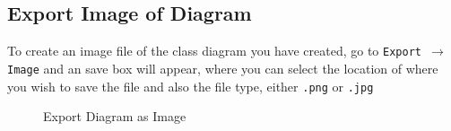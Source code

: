 \documentclass[a4paper]{article}
\begin{document}
\subsection{Export Image of Diagram}
To create an image file of the class diagram you have created, go to \texttt{Export $\rightarrow$ Image} and an save box will appear, where you can select the location of where you wish to save the file and also the file type, either
\texttt{.png} or \texttt{.jpg}
\begin{figure}[H]
\begin{center}
 \imagespace
{}
\caption{Export Diagram as Image}
\end{center}
\end{figure}
\end{document}
